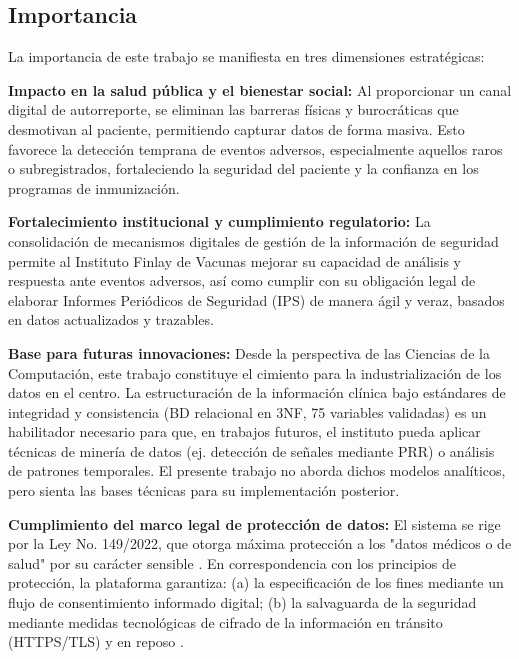 \subsection{Importancia}

La importancia de este trabajo se manifiesta en tres dimensiones estratégicas:

\textbf{Impacto en la salud pública y el bienestar social:} Al proporcionar un canal digital de \gls{autorreporte}, se eliminan las barreras físicas y burocráticas que desmotivan al paciente, permitiendo capturar datos de forma masiva. Esto favorece la detección temprana de eventos adversos, especialmente aquellos raros o subregistrados, fortaleciendo la seguridad del paciente y la confianza en los programas de inmunización.

\textbf{Fortalecimiento institucional y cumplimiento regulatorio:} La consolidación de mecanismos digitales de gestión de la información de seguridad permite al Instituto Finlay de Vacunas mejorar su capacidad de análisis y respuesta ante eventos adversos, así como cumplir con su obligación legal de elaborar Informes Periódicos de Seguridad (IPS) de manera ágil y veraz, basados en datos actualizados y trazables.

\textbf{Base para futuras innovaciones:} Desde la perspectiva de las Ciencias de la Computación, este trabajo constituye el cimiento para la industrialización de los datos en el centro. La estructuración de la información clínica bajo estándares de integridad y consistencia (BD relacional en 3NF, 75 variables validadas) es un habilitador necesario para que, en trabajos futuros, el instituto pueda aplicar técnicas de minería de datos (ej. detección de señales mediante PRR) o análisis de patrones temporales. El presente trabajo no aborda dichos modelos analíticos, pero sienta las bases técnicas para su implementación posterior.

\textbf{Cumplimiento del marco legal de protección de datos:} El sistema se rige por la Ley No. 149/2022, que otorga máxima protección a los "datos médicos o de salud" por su carácter sensible \cite{cuba_ley_149_2022}. 
En correspondencia con los principios de protección, la plataforma garantiza: (a) la especificación de los fines mediante un flujo de consentimiento informado digital; (b) la salvaguarda de la seguridad mediante medidas tecnológicas de cifrado de la información en tránsito (HTTPS/TLS) y en reposo \cite{cuba_ley_149_2022}.















